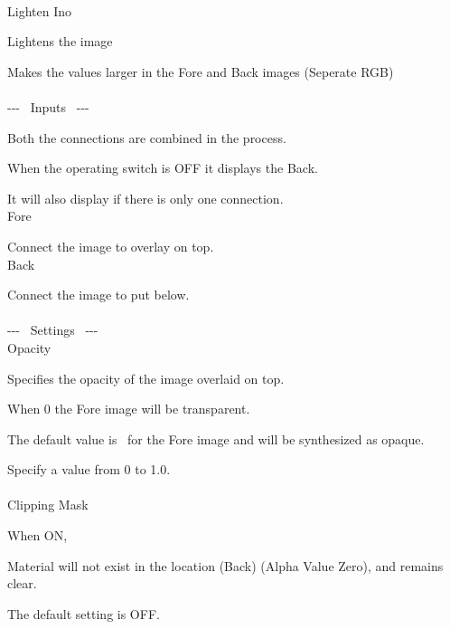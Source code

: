 \documentclass[a4paper,12pt]{article}
\begin{document}
\thispagestyle{empty}

\Large
\noindent \\
Lighten Ino\medskip
\par
\normalsize
Lightens the image\par
Makes the values larger in the Fore and Back images (Seperate RGB)\\
\\
-{-}- \ Inputs \ -{-}-\par
Both the connections are combined in the process.\par
When the operating switch is OFF it displays the Back.\par
It will also display if there is only one connection.\\
Fore\par
Connect the image to overlay on top.\\
Back\par
Connect the image to put below.\\
\\
-{-}- \ Settings \ -{-}-\\
Opacity\par
Specifies the opacity of the image overlaid on top.\par
When 0 the Fore image will be transparent.\par
The default value is \textquotedbl \ for the Fore image and will be synthesized as opaque.\par
Specify a value from 0 to 1.0.\\
\\
Clipping Mask\par
When ON,\par
Material will not exist in the location (Back) (Alpha Value Zero), and remains clear.\par
The default setting is OFF.
\end{document}
